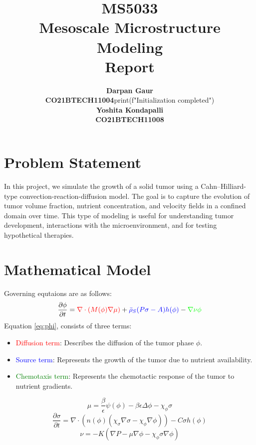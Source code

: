 \documentclass[12pt]{article}
\title{
    \textbf{MS5033} \\
    \textbf{Mesoscale Microstructure Modeling} \\ 
    \textbf{Report} \\
}
\author{
    \begin{tabular}{c}
        \textbf{Darpan Gaur} \\
        \textbf{CO21BTECH11004}print(f"Initialization completed")
    \end{tabular}
    \begin{tabular}{c}
        \textbf{Yoshita Kondapalli} \\
        \textbf{CO21BTECH11008}
    \end{tabular}
}
\date{}
\begin{document}
\maketitle

\hrulefill

\section*{Problem Statement}
In this project, we simulate the growth of a solid tumor using a Cahn–Hilliard-type convection-reaction-diffusion model. The goal is to capture the evolution of tumor volume fraction, nutrient concentration, and velocity fields in a confined domain over time. This type of modeling is useful for understanding tumor development, interactions with the microenvironment, and for testing hypothetical therapies. 

\section{Mathematical Model}
Governing equtaions are as follows:
\begin{equation}
    \frac{\partial \phi}{\partial t} = \textcolor{red}{\nabla \cdot \left( M(\phi) \nabla \mu \right)} + \textcolor{blue}{\bar{\rho}_S (P\sigma -A) h(\phi)} - \textcolor{green}{\nabla \nu \phi}
    \label{eq:phi}
\end{equation}
Equation \ref{eq:phi}, consists of three terms:
\begin{itemize}
    \item \textcolor{red}{Diffusion term}: Describes the diffusion of the tumor phase $\phi$.
    \item \textcolor{blue}{Source term}: Represents the growth of the tumor due to nutrient availability.
    \item \textcolor{green}{Chemotaxis term}: Represents the chemotactic response of the tumor to nutrient gradients.
\end{itemize}
\begin{equation}
    \mu = \frac{\beta}{\epsilon} \psi(\phi) - \beta \epsilon \Delta \phi - \chi_\phi \sigma
\end{equation} 
\begin{equation}
    \frac{\partial \sigma}{\partial t} = \nabla \cdot (n(\phi) (\chi_\sigma \nabla \sigma - \chi_\phi \nabla \phi)) - C \sigma h(\phi)
\end{equation}
\begin{equation}
    \nu = - K (\nabla P - \mu \nabla \phi - \chi_\phi \sigma \nabla \phi)
\end{equation}
\end{document}
